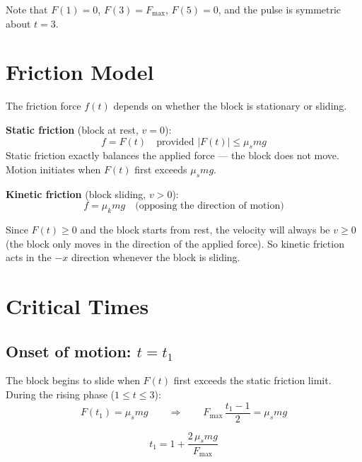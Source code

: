 \documentclass[11pt]{article}
\begin{document}
\noindent
Note that $F(1) = 0$, $F(3) = F_{\max}$, $F(5) = 0$, and the pulse is symmetric about $t = 3$.

\section{Friction Model}

The friction force $f(t)$ depends on whether the block is stationary or sliding.

\medskip
\noindent
\textbf{Static friction} (block at rest, $v = 0$):
\begin{equation}
f = F(t) \quad \text{provided } |F(t)| \le \mu_s m g
\label{eq:static}
\end{equation}
Static friction exactly balances the applied force --- the block does not move.  Motion initiates when $F(t)$ first exceeds $\mu_s m g$.

\medskip
\noindent
\textbf{Kinetic friction} (block sliding, $v > 0$):
\begin{equation}
f = \mu_k m g \quad \text{(opposing the direction of motion)}
\label{eq:kinetic}
\end{equation}

\noindent
Since $F(t) \ge 0$ and the block starts from rest, the velocity will always be $v \ge 0$ (the block only moves in the direction of the applied force).  So kinetic friction acts in the $-x$ direction whenever the block is sliding.

\section{Critical Times}

\subsection{Onset of motion: $t = t_1$}

The block begins to slide when $F(t)$ first exceeds the static friction limit.  During the rising phase ($1 \le t \le 3$):
\begin{equation}
F(t_1) = \mu_s m g
\qquad\Longrightarrow\qquad
F_{\max}\,\frac{t_1 - 1}{2} = \mu_s m g
\end{equation}

\begin{equation}
\boxed{t_1 = 1 + \frac{2\,\mu_s m g}{F_{\max}}}
\label{eq:t1}
\end{equation}
\end{document}
